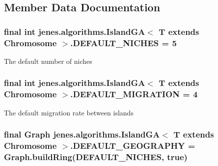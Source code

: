 \subsection{Member Data Documentation}
\hypertarget{classjenes_1_1algorithms_1_1_island_g_a_3_01_t_01extends_01_chromosome_01_4_37c9c99c1181aa1f194ad610bdb4d25f}{
\subsubsection[DEFAULT\_\-NICHES]{\setlength{\rightskip}{0pt plus 5cm}final int jenes.algorithms.IslandGA$<$ T extends Chromosome $>$.{\bf DEFAULT\_\-NICHES} = 5}}
\label{classjenes_1_1algorithms_1_1_island_g_a_3_01_t_01extends_01_chromosome_01_4_37c9c99c1181aa1f194ad610bdb4d25f}


The default number of niches \hypertarget{classjenes_1_1algorithms_1_1_island_g_a_3_01_t_01extends_01_chromosome_01_4_114bd755cf3def2fffb318ab4f40569a}{
\subsubsection[DEFAULT\_\-MIGRATION]{\setlength{\rightskip}{0pt plus 5cm}final int jenes.algorithms.IslandGA$<$ T extends Chromosome $>$.{\bf DEFAULT\_\-MIGRATION} = 4}}
\label{classjenes_1_1algorithms_1_1_island_g_a_3_01_t_01extends_01_chromosome_01_4_114bd755cf3def2fffb318ab4f40569a}


The default migration rate between islands \hypertarget{classjenes_1_1algorithms_1_1_island_g_a_3_01_t_01extends_01_chromosome_01_4_e27b28d3f2b4f90898a4cc90a9bd1bd9}{
\subsubsection[DEFAULT\_\-GEOGRAPHY]{\setlength{\rightskip}{0pt plus 5cm}final Graph jenes.algorithms.IslandGA$<$ T extends Chromosome $>$.{\bf DEFAULT\_\-GEOGRAPHY} = Graph.buildRing({\bf DEFAULT\_\-NICHES}, true)}}
\label{classjenes_1_1algorithms_1_1_island_g_a_3_01_t_01extends_01_chromosome_01_4_e27b28d3f2b4f90898a4cc90a9bd1bd9}


